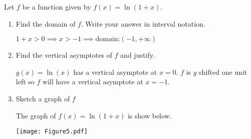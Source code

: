 \documentclass[nooutcomes]{ximera}
\begin{document}
\begin{problem}
Let $f$ be a function given by $f(x)=\ln(1+x)$.

	\begin{enumerate}
	\item Find the domain of $f$.  Write your answer in interval notation.
	\begin{freeResponse}
	$1+x>0 \implies x>-1 \implies \text{domain:}(-1,+\infty)$
	\end{freeResponse}
	
	\item Find the vertical asymptotes of $f$ and justify.
	\begin{freeResponse}
	$g(x)=\ln(x)$ has a vertical asymptote at $x=0$.  $f$ is $g$ shifted one unit left so $f$ will have a vertical asymptote at $x=-1$. 
	
	\end{freeResponse}

	\item Sketch a graph of $f$

	\begin{freeResponse} The graph of $f(x)=\ln(1+x)$ is show below.
  \begin{center}
    \texttt{[image: Figure5.pdf]}
  \end{center}
	\end{freeResponse}
\end{enumerate}

\end{problem}
\end{document}
